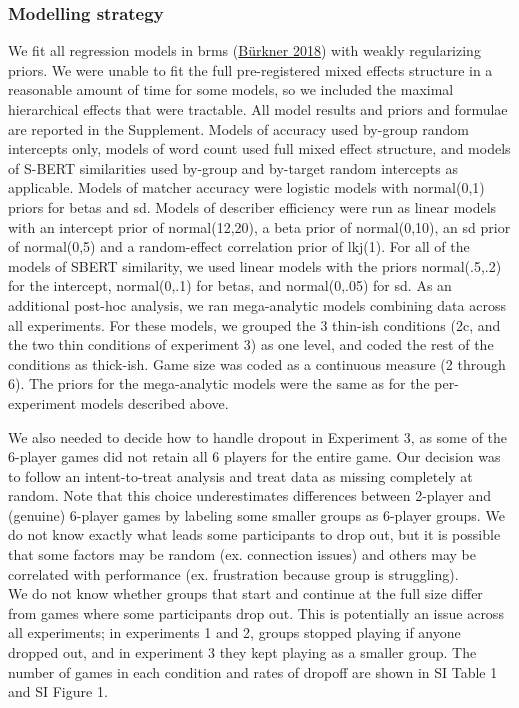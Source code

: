 \documentclass[
  english,
]{article}
\begin{document}
\hypertarget{modelling-strategy}{%
\subsubsection{Modelling strategy}\label{modelling-strategy}}

We fit all regression models in brms (\protect\hyperlink{ref-burkner2018}{Bürkner 2018}) with weakly regularizing priors.
We were unable to fit the full pre-registered mixed effects structure in a reasonable amount of time for some models, so we included the maximal hierarchical effects that were tractable.
All model results and priors and formulae are reported in the Supplement.
Models of accuracy used by-group random intercepts only, models of word count used full mixed effect structure, and models of S-BERT similarities used by-group and by-target random intercepts as applicable.
Models of matcher accuracy were logistic models with normal(0,1) priors for betas and sd.
Models of describer efficiency were run as linear models with an intercept prior of normal(12,20), a beta prior of normal(0,10), an sd prior of normal(0,5) and a random-effect correlation prior of lkj(1).
For all of the models of SBERT similarity, we used linear models with the priors normal(.5,.2) for the intercept, normal(0,.1) for betas, and normal(0,.05) for sd.
As an additional post-hoc analysis, we ran mega-analytic models combining data across all experiments.
For these models, we grouped the 3 thin-ish conditions (2c, and the two thin conditions of experiment 3) as one level, and coded the rest of the conditions as thick-ish.
Game size was coded as a continuous measure (2 through 6). The priors for the mega-analytic models were the same as for the per-experiment models described above.

We also needed to decide how to handle dropout in Experiment 3, as some of the 6-player games did not retain all 6 players for the entire game.
Our decision was to follow an intent-to-treat analysis and treat data as missing completely at random.
Note that this choice underestimates differences between 2-player and (genuine) 6-player games by labeling some smaller groups as 6-player groups.
We do not know exactly what leads some participants to drop out, but it is possible that some factors may be random (ex. connection issues) and others may be correlated with performance (ex. frustration because group is struggling).\\
We do not know whether groups that start and continue at the full size differ from games where some participants drop out.
This is potentially an issue across all experiments; in experiments 1 and 2, groups stopped playing if anyone dropped out, and in experiment 3 they kept playing as a smaller group.
The number of games in each condition and rates of dropoff are shown in SI Table 1 and SI Figure 1.
\end{document}
